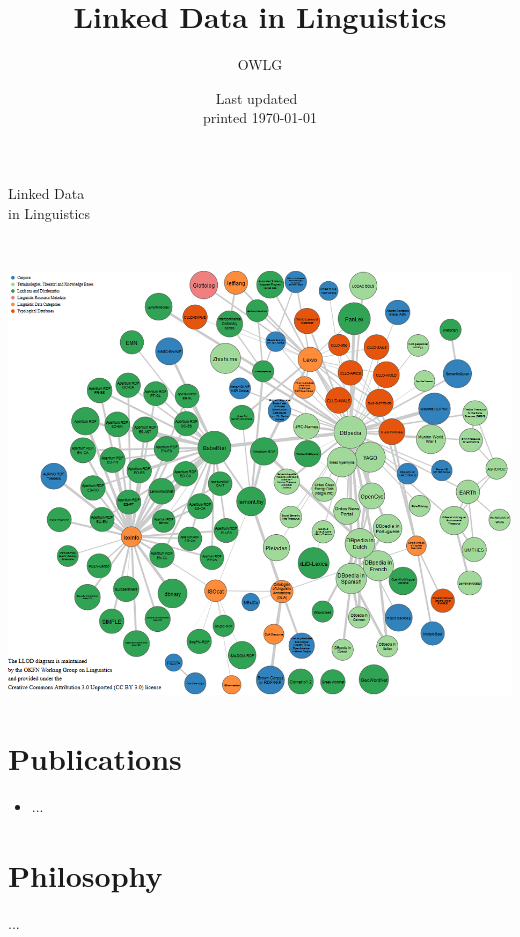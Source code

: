 \documentclass[
notumble,
nofoldmark,
]{leaflet}
\title{Linked Data in Linguistics}
\author{%
  OWLG}
\date{Last updated~\docdate\\printed \today}
\begin{document}
%
\thispagestyle{empty}
 
 

\vspace*{12cm}

\hspace*{-6mm}
\parbox{\textwidth}{
\sffamily
\parbox{\textwidth}{\Huge Linked Data \\ in Linguistics}\\ 
}
 

\newpage %
\includegraphics[width=2\textwidth]{llod-cloud.png}
\section{Publications}
\begin{itemize}
\item ...
\end{itemize} 

\newpage %
\vspace*{12.35cm} 
 \section{Philosophy}
 \parbox{\textwidth}{
...
 }

\newpage  %
\end{document}
